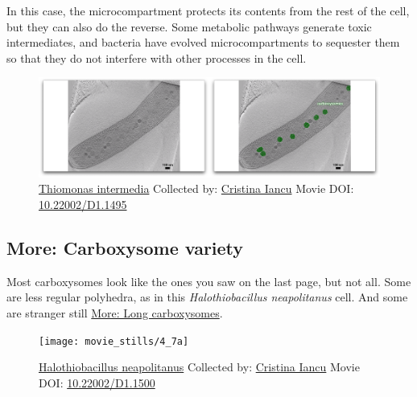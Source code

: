 \documentclass[]{tufte-book}
\begin{document}
In this case, the microcompartment protects its contents from the rest
of the cell, but they can also do the reverse. Some metabolic pathways
generate toxic intermediates, and bacteria have evolved
microcompartments to sequester them so that they do not interfere with
other processes in the cell.





\begin{figure}
\includegraphics{movie_stills/4_7} \caption[\protect\hyperlink{tree}{Thiomonas intermedia} Collected by:
\protect\hyperlink{cristina_iancu}{Cristina Iancu} Movie DOI:
\href{https://doi.org/10.22002/D1.1495}{10.22002/D1.1495}]{\protect\hyperlink{tree}{Thiomonas intermedia} Collected by:
\protect\hyperlink{cristina_iancu}{Cristina Iancu} Movie DOI:
\href{https://doi.org/10.22002/D1.1495}{10.22002/D1.1495}}\label{fig:4-7}
\end{figure}

\hypertarget{Carboxysome_variety}{\subsection*{More: Carboxysome
variety}\label{Carboxysome_variety}}

Most carboxysomes look like the ones you saw on the last page, but not
all. Some are less regular polyhedra, as in this \emph{Halothiobacillus
neapolitanus} cell. And some are stranger still
\protect\hyperlink{Long_carboxysomes}{More: Long carboxysomes}.





\begin{figure}
\texttt{[image: movie\_stills/4\_7a]} \caption[\protect\hyperlink{tree}{Halothiobacillus neapolitanus}
Collected by: \protect\hyperlink{cristina_iancu}{Cristina Iancu} Movie
DOI: \href{https://doi.org/10.22002/D1.1500}{10.22002/D1.1500}]{\protect\hyperlink{tree}{Halothiobacillus neapolitanus}
Collected by: \protect\hyperlink{cristina_iancu}{Cristina Iancu} Movie
DOI: \href{https://doi.org/10.22002/D1.1500}{10.22002/D1.1500}}\label{fig:4-7a}
\end{figure}
\end{document}

